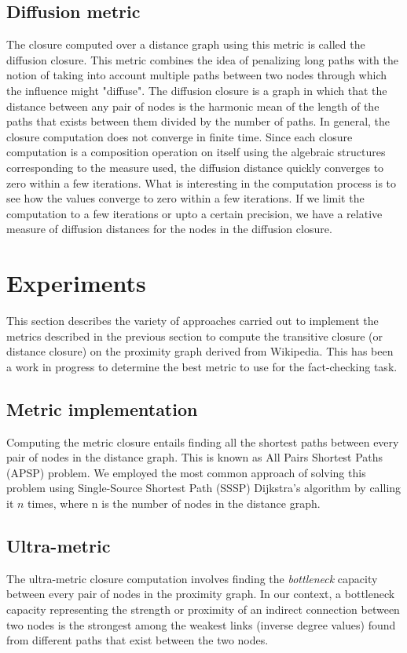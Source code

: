 \documentclass[12pt]{article}
\begin{document}
\subsection{Diffusion metric}
The closure computed over a distance graph using this metric is called the diffusion closure. This metric combines the idea of penalizing long paths with the notion of taking into account multiple paths between two nodes through which the influence might "diffuse". The diffusion closure is a  graph in which that the distance between any pair of nodes is the harmonic mean of the length of the paths that exists between them divided by the number of paths. In general, the closure computation does not converge in finite time. Since each closure computation is a composition operation on itself using the algebraic structures corresponding to the measure used, the diffusion distance quickly converges to zero within a few iterations. What is interesting in the computation process is to see how the values converge to zero within a few iterations. If we limit the computation to a few iterations or upto a certain precision, we have a relative measure of diffusion distances for the nodes in the diffusion closure.



\section{Experiments}
This section describes the variety of approaches carried out to implement the metrics described in the previous section to compute the transitive closure (or distance closure) on the proximity graph derived from Wikipedia. This has been a work in progress to determine the best metric to use for the fact-checking task.

\subsection{Metric implementation}
Computing the metric closure entails finding all the shortest paths between every pair of nodes in the distance graph. This is known as All Pairs Shortest Paths (APSP) problem. We employed the most common approach of solving this problem using Single-Source Shortest Path (SSSP) Dijkstra's algorithm by calling it $n$ times, where n is the number of nodes in the distance graph. 

\subsection{Ultra-metric} 
The ultra-metric closure computation involves finding the \textit{bottleneck} capacity between every pair of nodes in the proximity graph. In our context, a bottleneck capacity representing the strength or proximity of an indirect connection between two nodes is the strongest among the weakest links (inverse degree values) found from different paths that exist between the two nodes. 
\end{document}
